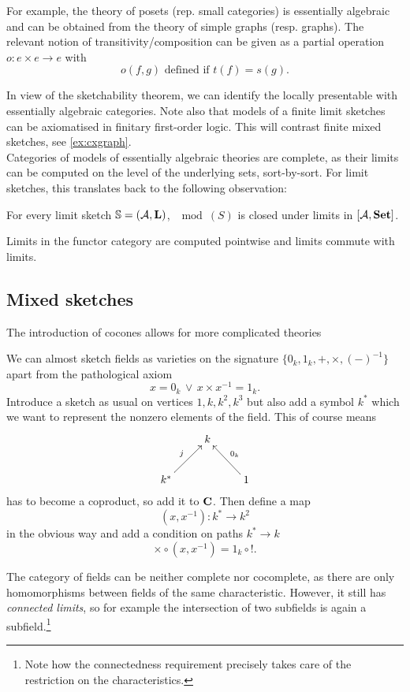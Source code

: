 For example, the theory of posets (rep. small categories) is essentially algebraic and can be obtained from the theory of simple graphs (resp. graphs). The relevant notion of transitivity/composition can be given as a partial operation $o : e \times e \to e$ with
\[ o(f, g) \text{ defined if } t(f) = s(g). \]

In view of the sketchability theorem, we can identify the locally presentable with essentially algebraic categories. Note also that models of a finite limit sketches can be axiomatised in finitary first-order logic. This will contrast finite mixed sketches, see \ref{ex:cxgraph}. \\

Categories of models of essentially algebraic theories are complete, as their limits can be computed on the level of the underlying sets, sort-by-sort. For limit sketches, this translates back to the following observation:

\begin{Proposition}
For every limit sketch $\mathbb S = (\mathcal{A}, \textbf{L})$, $\mod(S)$ is closed under limits in $[\mathcal{A},\mathbf{Set}]$.
\end{Proposition}
\begin{Proof}
Limits in the functor category are computed pointwise and limits commute with limits.
\end{Proof}

\subsection{Mixed sketches}
The introduction of cocones allows for more complicated theories

\begin{Example}[Fields]
We can almost sketch fields as varieties on the signature $\{0_k,1_k,+,\times,(-)^{-1}\}$ apart from the pathological axiom
\[ x = 0_k \,\vee\,x \times x^{-1} = 1_k. \] 
Introduce a sketch as usual on vertices $1,k,k^2,k^3$ but also add a symbol $k^*$ which we want to represent the nonzero elements of the field. This of course means
\[
\xymatrix{
& k & \\
k^* \ar[ru]^{j} & & 1 \ar[lu]_{0_k}
}\]
has to become a coproduct, so add it to $\textbf{C}$. Then define a map 
\[ (x,x^{-1}) : k^* \to k^2 \]
in the obvious way and add a condition on paths $k^* \to k$
\[ \times \circ (x,x^{-1}) = 1_k \circ !. \]
\end{Example}

The category of fields can be neither complete nor cocomplete, as there are only homomorphisms between fields of the same characteristic. However, it still has \emph{connected limits}, so for example the intersection of two subfields is again a subfield.\footnote{Note how the connectedness requirement precisely takes care of the restriction on the characteristics.} \\


